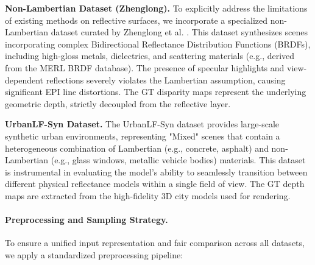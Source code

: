 \documentclass[lettersize,journal]{IEEEtran}
\begin{document}
\textbf{Non-Lambertian Dataset (Zhenglong).} To explicitly address the limitations of existing methods on reflective surfaces, we incorporate a specialized non-Lambertian dataset curated by Zhenglong et al. \cite{nonnon}. This dataset synthesizes scenes incorporating complex Bidirectional Reflectance Distribution Functions (BRDFs), including high-gloss metals, dielectrics, and scattering materials (e.g., derived from the MERL BRDF database). The presence of specular highlights and view-dependent reflections severely violates the Lambertian assumption, causing significant EPI line distortions. The GT disparity maps represent the underlying geometric depth, strictly decoupled from the reflective layer.

\textbf{UrbanLF-Syn Dataset.} The UrbanLF-Syn dataset \cite{epiepi} provides large-scale synthetic urban environments, representing "Mixed" scenes that contain a heterogeneous combination of Lambertian (e.g., concrete, asphalt) and non-Lambertian (e.g., glass windows, metallic vehicle bodies) materials. This dataset is instrumental in evaluating the model's ability to seamlessly transition between different physical reflectance models within a single field of view. The GT depth maps are extracted from the high-fidelity 3D city models used for rendering.

\paragraph{Preprocessing and Sampling Strategy.}

To ensure a unified input representation and fair comparison across all datasets, we apply a standardized preprocessing pipeline:
\end{document}
